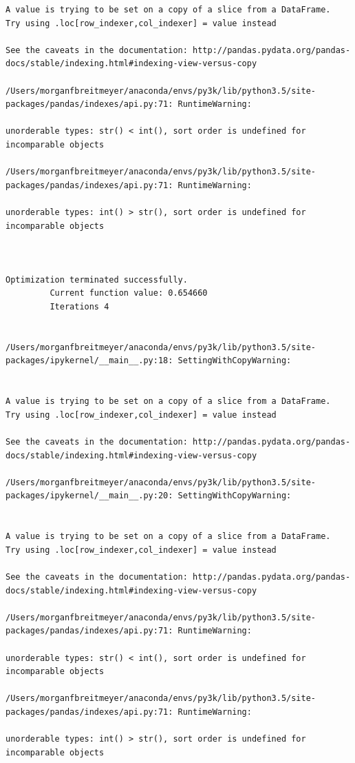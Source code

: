 \begin{lstlisting}
A value is trying to be set on a copy of a slice from a DataFrame.
Try using .loc[row_indexer,col_indexer] = value instead

See the caveats in the documentation: http://pandas.pydata.org/pandas-docs/stable/indexing.html#indexing-view-versus-copy

/Users/morganfbreitmeyer/anaconda/envs/py3k/lib/python3.5/site-packages/pandas/indexes/api.py:71: RuntimeWarning:

unorderable types: str() < int(), sort order is undefined for incomparable objects

/Users/morganfbreitmeyer/anaconda/envs/py3k/lib/python3.5/site-packages/pandas/indexes/api.py:71: RuntimeWarning:

unorderable types: int() > str(), sort order is undefined for incomparable objects



Optimization terminated successfully.
         Current function value: 0.654660
         Iterations 4


/Users/morganfbreitmeyer/anaconda/envs/py3k/lib/python3.5/site-packages/ipykernel/__main__.py:18: SettingWithCopyWarning:


A value is trying to be set on a copy of a slice from a DataFrame.
Try using .loc[row_indexer,col_indexer] = value instead

See the caveats in the documentation: http://pandas.pydata.org/pandas-docs/stable/indexing.html#indexing-view-versus-copy

/Users/morganfbreitmeyer/anaconda/envs/py3k/lib/python3.5/site-packages/ipykernel/__main__.py:20: SettingWithCopyWarning:


A value is trying to be set on a copy of a slice from a DataFrame.
Try using .loc[row_indexer,col_indexer] = value instead

See the caveats in the documentation: http://pandas.pydata.org/pandas-docs/stable/indexing.html#indexing-view-versus-copy

/Users/morganfbreitmeyer/anaconda/envs/py3k/lib/python3.5/site-packages/pandas/indexes/api.py:71: RuntimeWarning:

unorderable types: str() < int(), sort order is undefined for incomparable objects

/Users/morganfbreitmeyer/anaconda/envs/py3k/lib/python3.5/site-packages/pandas/indexes/api.py:71: RuntimeWarning:

unorderable types: int() > str(), sort order is undefined for incomparable objects




\end{lstlisting}
